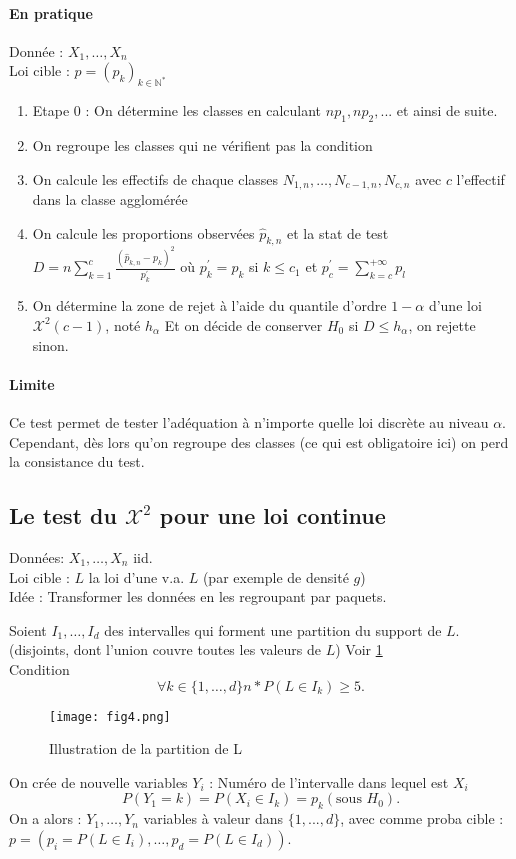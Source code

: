 \documentclass{article}
\theoremstyle{plain}%
\theoremstyle{definition}
\theoremstyle{remark}
\begin{document}
\paragraph{En pratique}
    Donnée : $ X_1, \dots, X_n$ \\
    Loi cible : $p = (p_k)_{k \in \mathbb{N}^*}$
    \begin{enumerate}
        \item Etape 0 : On détermine les classes en calculant $ np_1, np_2, ... $ et ainsi de suite.
        \item On regroupe les classes qui ne vérifient pas la condition
        \item On calcule les effectifs de chaque classes $ N_{1,n}, \dots, N_{c-1, n}, N_{c,n} $ avec $ c $ l'effectif dans la classe agglomérée
        \item On calcule les proportions observées $ \hat{p}_{k,n} $ et la stat de test $ D = n \sum_{k=1}^{c} \frac{(\hat{p}_{k,n} - p_k)^2}{p_k^\prime } $ où $ p_k^\prime = p_k $ si $ k \leq c_1 $ et $ p^\prime _c = \sum_{k=c}^{+\infty } p_l $ 
        \item On détermine la zone de rejet à l'aide du quantile d'ordre $ 1 - \alpha $ d'une loi $ \mathcal{X}^2(c-1) $, noté $ h_\alpha  $ Et on décide de conserver $ H_0 $ si $ D \leq h_\alpha  $, on rejette sinon.
    \end{enumerate}

\paragraph{Limite}
Ce test permet de tester l'adéquation à n'importe quelle loi discrète au niveau $ \alpha  $. Cependant, dès lors qu'on regroupe des classes (ce qui est obligatoire ici) on perd la consistance du test. 


\subsection{Le test du $ \mathcal{X}^2$ pour une loi continue}
Données: $ X_1, \dots, X_n $ iid. \\
Loi cible : $ L $ la loi d'une v.a. $ L $ (par exemple de densité $ g $) \\
Idée : Transformer les données en les regroupant par paquets. 

Soient $ I_1, \dots, I_d $ des intervalles qui forment une partition du support de $ L $. (disjoints, dont l'union couvre toutes les valeurs de $ L $) Voir \ref{fig4} \\
Condition 
\[
    \forall k \in \{1, \dots,d \} n * P(L \in I_k) \geq 5
.\]
\begin{figure}[!htbp]
    \centering
    \texttt{[image: fig4.png]}
    \caption{Illustration de la partition de L}
    \label{fig4}
\end{figure}
On crée de nouvelle variables $ Y_i $ : Numéro de l'intervalle dans lequel est $ X_i $ 
\[
    P(Y_1=k) = P(X_i \in I_k) = p_k (\text{sous }H_0)
.\]
On a alors : $ Y_1, \dots, Y_n $ variables à valeur dans $ \{1,...,d\} $, avec comme proba cible : $ p=(p_i = P(L \in I_i), \dots, p_d = P(L \in I_d)) $. 
\end{document}
